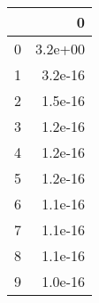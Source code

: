 \begin{tabular}{lr}
\toprule
{} &       0 \\
\midrule
0 & 3.2e+00 \\
1 & 3.2e-16 \\
2 & 1.5e-16 \\
3 & 1.2e-16 \\
4 & 1.2e-16 \\
5 & 1.2e-16 \\
6 & 1.1e-16 \\
7 & 1.1e-16 \\
8 & 1.1e-16 \\
9 & 1.0e-16 \\
\bottomrule
\end{tabular}
